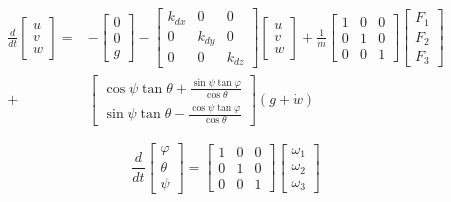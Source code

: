$$
\begin{aligned}
\frac{d}{d t}\left[\begin{array}{c}
u \\
v \\
w
\end{array}\right]=&-\left[\begin{array}{l}
0 \\
0 \\
g
\end{array}\right]-\left[\begin{array}{ccc}
k_{d x} & 0 & 0 \\
0 & k_{d y} & 0 \\
0 & 0 & k_{d z}
\end{array}\right]\left[\begin{array}{c}
u \\
v \\
w
\end{array}\right]+\frac{1}{m}\left[\begin{array}{lll}
1 & 0 & 0 \\
0 & 1 & 0 \\
0 & 0 & 1
\end{array}\right]\left[\begin{array}{l}
F_{1} \\
F_{2} \\
F_{3}
\end{array}\right] \\
+& {\left[\begin{array}{c}
\cos \psi \tan \theta+\frac{\sin \psi \tan \varphi}{\cos \theta} \\
\sin \psi \tan \theta-\frac{\cos \psi \tan \varphi}{\cos \theta}
\end{array}\right](g+\dot{w}) }
\end{aligned}
$$

$$
\frac{d}{d t}\left[\begin{array}{l}
\varphi \\
\theta \\
\psi
\end{array}\right]=\left[\begin{array}{lll}
1 & 0 & 0 \\
0 & 1 & 0 \\
0 & 0 & 1
\end{array}\right]\left[\begin{array}{l}
\omega_{1} \\
\omega_{2} \\
\omega_{3}
\end{array}\right]
$$

